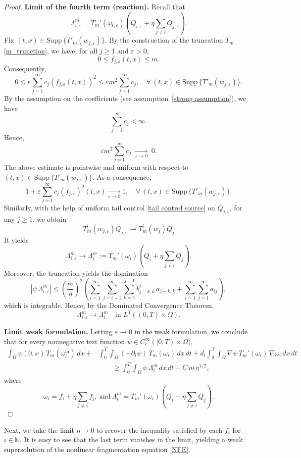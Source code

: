 \documentclass[a4paper,12pt,reqno]{amsart}
\theoremstyle{plain}
\numberwithin{equation}{section}
\begin{document}
\begin{proof}
		\medskip
		\noindent\textbf{Limit of the fourth term (reaction).}
		Recall that
		\[
		\Lambda^m_{i,\varepsilon}
		=
		T_m'(\omega_{i,\varepsilon})
		\left(
		Q_{i,\varepsilon}
		+
		\eta \sum_{j\ne i} Q_{j,\varepsilon}
		\right).
		\]
		Fix $(t,x)\in \text{Supp}\, \{ T'_m{(w_{j,\varepsilon})}\}$.  
		By the construction of the truncation $T_m$ \eqref{m_trunction}, we have, for all $j\ge1$ and
		$\varepsilon>0$,
		\[
		0 \le f_{j,\varepsilon}(t,x) \le m .
		\]
		Consequently, 
		\[
		0 \le \varepsilon\sum_{j=1}^{\infty} c_j (f_{j,\varepsilon}(t,x))^2
		\le
		\varepsilon m^2 \sum_{j=1}^{\infty} c_j, \quad \forall \, (t,x)\in \text{Supp}\, \{ T'_m{(w_{j,\varepsilon})}\}. 
		\]
		By the assumption on the coefficients (see assumption~\ref{strong assumption}), we have
		\[
		\sum_{j=1}^{\infty} c_j < \infty .
		\]
		Hence,
		\[
		\varepsilon m^2 \sum_{j=1}^{\infty} c_j
		\;\xrightarrow[\varepsilon\to0]{}\; 0 .
		\]
		The above estimate is pointwise and uniform with respect to $(t,x)\in \text{Supp}\, \{ T'_m{(w_{j,\varepsilon})}\}$.
		As a consequence,
		\[
		1+\varepsilon\sum_{j=1}^{\infty} c_j (f_{j,\varepsilon})^2(t,x)
		\xrightarrow[\varepsilon\to0]{}
		1,
		\quad \forall \, (t,x)\in \text{Supp}\, \{ T'_m{(w_{j,\varepsilon})}\} .
		\]
		Similarly, with the help of uniform tail control \eqref{tail control source} on $Q_{j,\varepsilon}$, for any $j\ge 1$, we obtain
		\[
		T_{m}^{'}(w_{j,\varepsilon})Q_{j,\varepsilon} \to T_m^{'}(w_j)Q_j
		\]
		It yields
		\[
		\Lambda^m_{i,\varepsilon} \to \Lambda^m_i
		:=
		T_m'(\omega_i)
		\left(
		Q_i + \eta \sum_{j\ne i} Q_j
		\right).
		\]
		Moreover, the truncation yields the domination
		\[
		|\psi\,\Lambda^m_{i,\varepsilon}|
		\le
		\left(\frac{m}{\eta}\right)^2
		\left(
		\sum_{i=1}^{\infty}\sum_{j=i+1}^{\infty}\sum_{k=1}^{j-1}
		b^i_{j-k,k}\,a_{j-k,k}
		+
		\sum_{i=1}^{\infty}\sum_{j=1}^{\infty} a_{ij}
		\right),
		\]
		which is integrable. Hence, by the Dominated Convergence Theorem,
		\[
		\Lambda^m_{i,\varepsilon} \to \Lambda^m_i
		\quad \text{in } L^1((0,T)\times\Omega).
		\]
		
		\medskip
		\noindent\textbf{Limit weak formulation.}
		Letting $\varepsilon\to0$ in the weak formulation, we conclude that for every
		nonnegative test function $\psi\in C_c^\infty([0,T)\times\Omega)$,
		\begin{align*}
			\int_{\Omega} \psi(0,x)\,T_m(\omega_i^{\mathrm{in}})\,dx
			+&
			\int_{0}^{T}\!\!\int_{\Omega}
			(-\partial_t\psi)\,T_m(\omega_i)\,dx\,dt
			+
			d_i \int_{0}^{T}\!\!\int_{\Omega}
			\nabla\psi\,
			T_m'(\omega_i)\,
			\nabla\omega_i\,dx\,dt
			\\
			&\qquad \ge
			\int_{0}^{T}\!\!\int_{\Omega}
			\psi\,\Lambda^m_i\,dx\,dt
			-
			C\,m\,\eta^{1/2},
		\end{align*}
		where
		\[
		\omega_i
		=
		f_i + \eta \sum_{j\ne i} f_j,
		\ \text{and} \
		\Lambda^m_i
		=
		T_m'(\omega_i)
		\left(
		Q_i + \eta \sum_{j\ne i} Q_j
		\right).
		\]
	\end{proof}
	Next, we take the limit $\eta \to 0$ to recover the inequality satisfied by each $f_i$ 
	for $i \in \mathbb{N}$. It is easy to see that the last term vanishes in the limit, 
	yielding a weak supersolution of the nonlinear fragmentation equation \eqref{NFE}.
	
\end{document}
